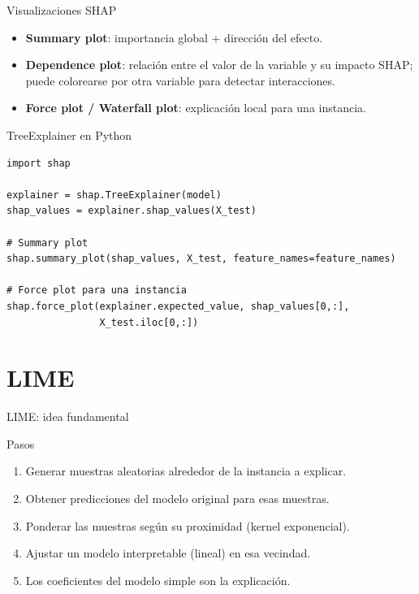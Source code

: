 \documentclass[aspectratio=169, 10pt, xcolor=table]{beamer}
\begin{document}
\begin{frame}{Visualizaciones SHAP}
    \begin{itemize}
        \item \textbf{Summary plot}: importancia global + dirección del efecto.
        \item \textbf{Dependence plot}: relación entre el valor de la variable y su impacto SHAP; puede colorearse por otra variable para detectar interacciones.
        \item \textbf{Force plot / Waterfall plot}: explicación local para una instancia.
    \end{itemize}
\end{frame}

\begin{frame}[fragile]{TreeExplainer en Python}
    \begin{lstlisting}
import shap

explainer = shap.TreeExplainer(model)
shap_values = explainer.shap_values(X_test)

# Summary plot
shap.summary_plot(shap_values, X_test, feature_names=feature_names)

# Force plot para una instancia
shap.force_plot(explainer.expected_value, shap_values[0,:],
                X_test.iloc[0,:])
    \end{lstlisting}
\end{frame}

\section{LIME}

\begin{frame}{LIME: idea fundamental}
    \begin{block}{Pasos}
        \begin{enumerate}
            \item Generar muestras aleatorias alrededor de la instancia a explicar.
            \item Obtener predicciones del modelo original para esas muestras.
            \item Ponderar las muestras según su proximidad (kernel exponencial).
            \item Ajustar un modelo interpretable (lineal) en esa vecindad.
            \item Los coeficientes del modelo simple son la explicación.
        \end{enumerate}
    \end{block}
\end{frame}
\end{document}
